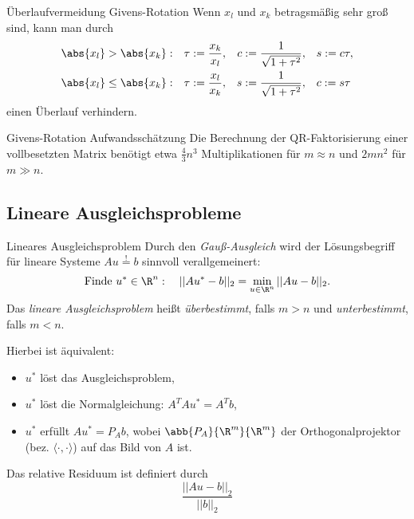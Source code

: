\begin{karte}{Überlaufvermeidung Givens-Rotation}
    Wenn \( x_l \) und \( x_k \) betragsmäßig sehr groß sind, kann man durch 
    \begin{align*}
        \abs{x_l} > \abs{x_k}: \quad &\tau := \frac{x_k}{x_l}, & c:= \frac{1}{\sqrt{1 + \tau^2}}, \quad &s := c\tau, \\
        \abs{x_l} \leq \abs{x_k}: \quad &\tau := \frac{x_l}{x_k}, & s := \frac{1}{\sqrt{1 + \tau^2}}, \quad &c := s\tau
    \end{align*}
    einen Überlauf verhindern.
\end{karte}

\begin{karte}{Givens-Rotation Aufwandsschätzung}
    Die Berechnung der QR-Faktorisierung einer vollbesetzten Matrix benötigt etwa 
    \( \frac{4}{3} n^3\) Multiplikationen für \( m \approx n \) und \( 2mn^2 \) 
    für \( m \gg n \).
\end{karte}

\subsection*{Lineare Ausgleichsprobleme}

\begin{karte}{Lineares Ausgleichsproblem}
    Durch den \textit{Gauß-Ausgleich} wird der Lösungsbegriff für 
    lineare Systeme \( Au \overset{!}{=} b \) sinnvoll verallgemeinert: 
    \[ \text{Finde } u^* \in \R^n: \quad ||Au^* - b||_2 = \min_{u\in\R^n} ||Au - b||_2. \]
    Das \textit{lineare Ausgleichsproblem} heißt \textit{überbestimmt}, falls \( m > n \) und 
    \textit{unterbestimmt}, falls \( m < n \).

    Hierbei ist äquivalent: 
    \begin{itemize}
        \item \( u^* \) löst das Ausgleichsproblem,
        \item \( u^* \) löst die Normalgleichung: \( A^T A u^* = A^T b \),
        \item \( u^* \) erfüllt \( A u^* = P_A b \), wobei \( \abb{P_A}{\R^m}{\R^m} \) 
        der Orthogonalprojektor (bez. \( \langle \cdot, \cdot\rangle \)) auf das Bild von \(A\) ist.
    \end{itemize}

    Das relative Residuum ist definiert durch 
    \[ \frac{ ||A u - b||_2 }{||b||_2} \]
\end{karte}

